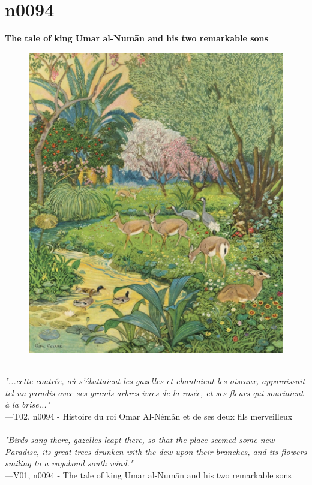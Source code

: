 \documentclass[../Carre_nights.tex]{subfiles}
\begin{document}
\newpage

\section{n0094}
\textbf{\Large{The tale of king Umar al-Num\=an and his two remarkable sons}} \\

\begin{figure}[ht]
\centering
\includegraphics[height=\figsize]{illustrations/volume_2/T02, n0094 - Histoire du roi Omar Al-Némân et de ses deux fils merveilleux.jpg}
\end{figure}

\textit{\\
"...cette contrée, où s’ébattaient les gazelles et chantaient les oiseaux, apparaissait tel un paradis avec ses grands arbres ivres de la rosée, et ses fleurs qui souriaient à la brise..."} \\
—T02, n0094 - Histoire du roi Omar Al-Némân et de ses deux fils merveilleux \\~\\
\textit{"Birds sang there, gazelles leapt there, so that the place seemed some new Paradise, its great trees drunken with the dew upon their branches, and its flowers smiling to a vagabond south wind."} \\
—V01, n0094 - The tale of king Umar al-Num\=an and his two remarkable sons
\end{document}
